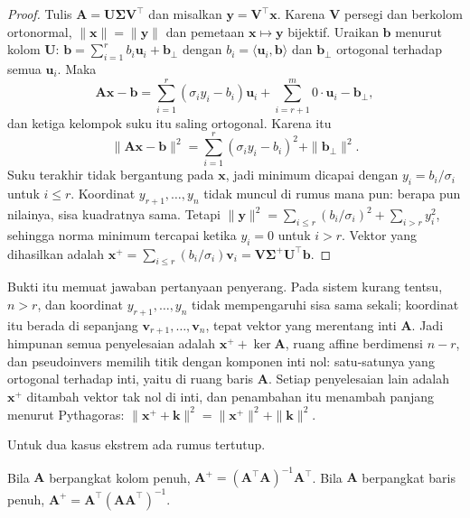 \begin{proof}
Tulis $\mathbf{A}=\mathbf{U}\boldsymbol{\Sigma}\mathbf{V}^{\top}$ dan misalkan
$\mathbf{y}=\mathbf{V}^{\top}\mathbf{x}$. Karena $\mathbf{V}$ persegi dan berkolom
ortonormal, $\|\mathbf{x}\|=\|\mathbf{y}\|$ dan pemetaan $\mathbf{x}\mapsto\mathbf{y}$
bijektif. Uraikan $\mathbf{b}$ menurut kolom $\mathbf{U}$:
$\mathbf{b}=\sum_{i=1}^{r}b_{i}\mathbf{u}_{i}+\mathbf{b}_{\perp}$ dengan
$b_{i}=\langle\mathbf{u}_{i},\mathbf{b}\rangle$ dan $\mathbf{b}_{\perp}$ ortogonal
terhadap semua $\mathbf{u}_{i}$. Maka
\[
  \mathbf{A}\mathbf{x}-\mathbf{b}
  =\sum_{i=1}^{r}(\sigma_{i}y_{i}-b_{i})\mathbf{u}_{i}+\sum_{i=r+1}^{m}0\cdot\mathbf{u}_{i}
   -\mathbf{b}_{\perp},
\]
dan ketiga kelompok suku itu saling ortogonal. Karena itu
\[
  \|\mathbf{A}\mathbf{x}-\mathbf{b}\|^{2}
  =\sum_{i=1}^{r}(\sigma_{i}y_{i}-b_{i})^{2}+\|\mathbf{b}_{\perp}\|^{2}.
\]
Suku terakhir tidak bergantung pada $\mathbf{x}$, jadi minimum dicapai dengan
$y_{i}=b_{i}/\sigma_{i}$ untuk $i\le r$. Koordinat $y_{r+1},\dots,y_{n}$ tidak muncul
di rumus mana pun: berapa pun nilainya, sisa kuadratnya sama. Tetapi
$\|\mathbf{y}\|^{2}=\sum_{i\le r}(b_{i}/\sigma_{i})^{2}+\sum_{i>r}y_{i}^{2}$, sehingga
norma minimum tercapai ketika $y_{i}=0$ untuk $i>r$. Vektor yang dihasilkan adalah
$\mathbf{x}^{+}=\sum_{i\le r}(b_{i}/\sigma_{i})\mathbf{v}_{i}
=\mathbf{V}\boldsymbol{\Sigma}^{+}\mathbf{U}^{\top}\mathbf{b}$.
\end{proof}

Bukti itu memuat jawaban pertanyaan penyerang. Pada sistem kurang tentsu, $n>r$, dan
koordinat $y_{r+1},\dots,y_{n}$ tidak mempengaruhi sisa sama sekali; koordinat itu
berada di sepanjang $\mathbf{v}_{r+1},\dots,\mathbf{v}_{n}$, tepat vektor yang merentang
inti $\mathbf{A}$. Jadi himpunan semua penyelesaian adalah $\mathbf{x}^{+}+\ker\mathbf{A}$,
ruang affine berdimensi $n-r$, dan pseudoinvers memilih titik dengan komponen inti nol:
satu-satunya yang ortogonal terhadap inti, yaitu di ruang baris $\mathbf{A}$.
Setiap penyelesaian lain adalah $\mathbf{x}^{+}$ ditambah vektor tak nol di inti, dan
penambahan itu menambah panjang menurut Pythagoras:
$\|\mathbf{x}^{+}+\mathbf{k}\|^{2}=\|\mathbf{x}^{+}\|^{2}+\|\mathbf{k}\|^{2}$.

Untuk dua kasus ekstrem ada rumus tertutup.

\begin{akibat}
Bila $\mathbf{A}$ berpangkat kolom penuh, $\mathbf{A}^{+}
=(\mathbf{A}^{\top}\mathbf{A})^{-1}\mathbf{A}^{\top}$. Bila $\mathbf{A}$ berpangkat
baris penuh, $\mathbf{A}^{+}=\mathbf{A}^{\top}(\mathbf{A}\mathbf{A}^{\top})^{-1}$.
\end{akibat}

